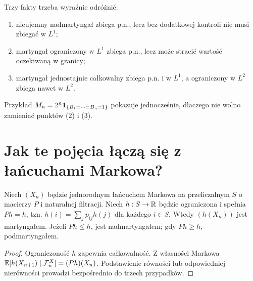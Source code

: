 \begin{przyklad}
Trzy fakty trzeba wyraźnie odróżnić:
\begin{enumerate}
\item nieujemny nadmartyngał zbiega p.n.,
  lecz bez dodatkowej kontroli nie musi zbiegać w $L^1$;
\item martyngał ograniczony w $L^1$ zbiega p.n.,
  lecz może stracić wartość oczekiwaną w granicy;
\item martyngał jednostajnie całkowalny zbiega
  p.n. i w $L^1$, a ograniczony w $L^2$
  zbiega nawet w $L^2$.
\end{enumerate}
Przykład $M_n=2^n\mathbf{1}_{\{B_1=\cdots=B_n=1\}}$
pokazuje jednocześnie, dlaczego nie wolno
zamieniać punktów (2) i (3).
\end{przyklad}

\section{Jak te pojęcia łączą się z łańcuchami Markowa?}

\begin{twierdzenie}
Niech $(X_n)$ będzie jednorodnym łańcuchem Markowa
na przeliczalnym $S$ o macierzy $P$ i naturalnej
filtracji. Niech $h:S\to\mathbb{R}$ będzie ograniczona
i spełnia $Ph=h$, tzn.
$h(i)=\sum_jp_{ij}h(j)$ dla każdego $i\in S$.
Wtedy $(h(X_n))$ jest martyngałem.
Jeżeli $Ph\leq h$, jest nadmartyngałem;
gdy $Ph\geq h$, podmartyngałem.
\end{twierdzenie}
\begin{proof}
Ograniczoność $h$ zapewnia całkowalność.
Z własności Markowa
$\mathbb{E}[h(X_{n+1})\mid\mathcal F_n^X]
=(Ph)(X_n)$.
Podstawienie równości lub odpowiedniej nierówności
prowadzi bezpośrednio do trzech przypadków.
\end{proof}

